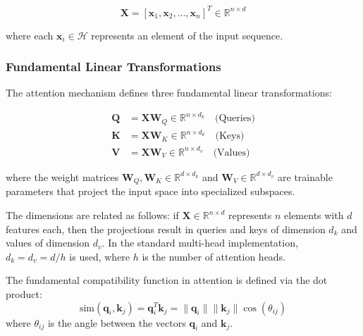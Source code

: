 \begin{equation}
    \mathbf{X} = [\mathbf{x}_1, \mathbf{x}_2, \ldots, \mathbf{x}_n]^T \in \mathbb{R}^{n \times d}
    \label{eq:input_matrix}
\end{equation}

where each $\mathbf{x}_i \in \mathcal{H}$ represents an element of the input sequence.

\subsubsection{Fundamental Linear Transformations}

The attention mechanism defines three fundamental linear transformations:

\begin{align}
    \mathbf{Q} &= \mathbf{X}\mathbf{W}_Q \in \mathbb{R}^{n \times d_k} \quad \text{(Queries)} \\
    \mathbf{K} &= \mathbf{X}\mathbf{W}_K \in \mathbb{R}^{n \times d_k} \quad \text{(Keys)} \\
    \mathbf{V} &= \mathbf{X}\mathbf{W}_V \in \mathbb{R}^{n \times d_v} \quad \text{(Values)}
    \label{eq:linear_projections}
\end{align}

where the weight matrices $\mathbf{W}_Q, \mathbf{W}_K \in \mathbb{R}^{d \times d_k}$ and $\mathbf{W}_V \in \mathbb{R}^{d \times d_v}$ are trainable parameters that project the input space into specialized subspaces.

The dimensions are related as follows: if $\mathbf{X} \in \mathbb{R}^{n \times d}$ represents $n$ elements with $d$ features each, then the projections result in queries and keys of dimension $d_k$ and values of dimension $d_v$. In the standard multi-head implementation, $d_k = d_v = d/h$ is used, where $h$ is the number of attention heads.

\begin{definition}\label{def:dot_product_similarity}
    The fundamental compatibility function in attention is defined via the dot product:
    \begin{equation}
        \text{sim}(\mathbf{q}_i, \mathbf{k}_j) = \mathbf{q}_i^T \mathbf{k}_j = \|\mathbf{q}_i\| \|\mathbf{k}_j\| \cos(\theta_{ij})
        \label{eq:dot_product_similarity}
    \end{equation}
    where $\theta_{ij}$ is the angle between the vectors $\mathbf{q}_i$ and $\mathbf{k}_j$.
\end{definition}

